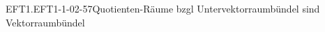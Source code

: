 \begin{REM}{EFT1.EFT1-1-02-57}{Quotienten-Räume bzgl Untervektorraumbündel sind Vektorraumbündel}

\end{REM}
